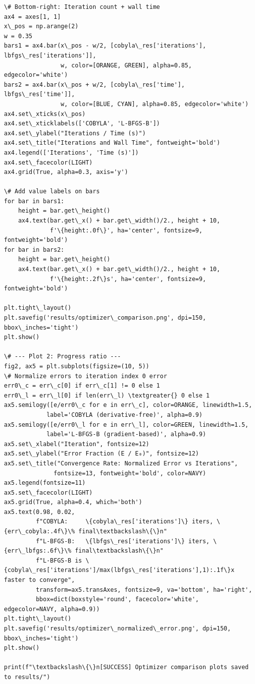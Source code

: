 \documentclass[12pt, a4paper]{article}
\begin{document}
\begin{lstlisting}[style=codestyle, caption={{optimizer_comparison.py --- COBYLA vs L-BFGS-B}}]
\# Bottom-right: Iteration count + wall time
ax4 = axes[1, 1]
x\_pos = np.arange(2)
w = 0.35
bars1 = ax4.bar(x\_pos - w/2, [cobyla\_res['iterations'], lbfgs\_res['iterations']],
                w, color=[ORANGE, GREEN], alpha=0.85, edgecolor='white')
bars2 = ax4.bar(x\_pos + w/2, [cobyla\_res['time'], lbfgs\_res['time']],
                w, color=[BLUE, CYAN], alpha=0.85, edgecolor='white')
ax4.set\_xticks(x\_pos)
ax4.set\_xticklabels(['COBYLA', 'L-BFGS-B'])
ax4.set\_ylabel("Iterations / Time (s)")
ax4.set\_title("Iterations and Wall Time", fontweight='bold')
ax4.legend(['Iterations', 'Time (s)'])
ax4.set\_facecolor(LIGHT)
ax4.grid(True, alpha=0.3, axis='y')

\# Add value labels on bars
for bar in bars1:
    height = bar.get\_height()
    ax4.text(bar.get\_x() + bar.get\_width()/2., height + 10,
             f'\{height:.0f\}', ha='center', fontsize=9, fontweight='bold')
for bar in bars2:
    height = bar.get\_height()
    ax4.text(bar.get\_x() + bar.get\_width()/2., height + 10,
             f'\{height:.2f\}s', ha='center', fontsize=9, fontweight='bold')

plt.tight\_layout()
plt.savefig('results/optimizer\_comparison.png', dpi=150, bbox\_inches='tight')
plt.show()

\# --- Plot 2: Progress ratio ---
fig2, ax5 = plt.subplots(figsize=(10, 5))
\# Normalize errors to iteration index 0 error
err0\_c = err\_c[0] if err\_c[1] != 0 else 1
err0\_l = err\_l[0] if len(err\_l) \textgreater{} 0 else 1
ax5.semilogy([e/err0\_c for e in err\_c], color=ORANGE, linewidth=1.5,
            label='COBYLA (derivative-free)', alpha=0.9)
ax5.semilogy([e/err0\_l for e in err\_l], color=GREEN, linewidth=1.5,
            label='L-BFGS-B (gradient-based)', alpha=0.9)
ax5.set\_xlabel("Iteration", fontsize=12)
ax5.set\_ylabel("Error Fraction (E / E₀)", fontsize=12)
ax5.set\_title("Convergence Rate: Normalized Error vs Iterations",
              fontsize=13, fontweight='bold', color=NAVY)
ax5.legend(fontsize=11)
ax5.set\_facecolor(LIGHT)
ax5.grid(True, alpha=0.4, which='both')
ax5.text(0.98, 0.02,
         f"COBYLA:     \{cobyla\_res['iterations']\} iters, \{err\_cobyla:.4f\}\% final\textbackslash\{\}n"
         f"L-BFGS-B:   \{lbfgs\_res['iterations']\} iters, \{err\_lbfgs:.6f\}\% final\textbackslash\{\}n"
         f"L-BFGS-B is \{cobyla\_res['iterations']/max(lbfgs\_res['iterations'],1):.1f\}x faster to converge",
         transform=ax5.transAxes, fontsize=9, va='bottom', ha='right',
         bbox=dict(boxstyle='round', facecolor='white', edgecolor=NAVY, alpha=0.9))
plt.tight\_layout()
plt.savefig('results/optimizer\_normalized\_error.png', dpi=150, bbox\_inches='tight')
plt.show()

print(f"\textbackslash\{\}n[SUCCESS] Optimizer comparison plots saved to results/")

\end{lstlisting}
\end{document}
